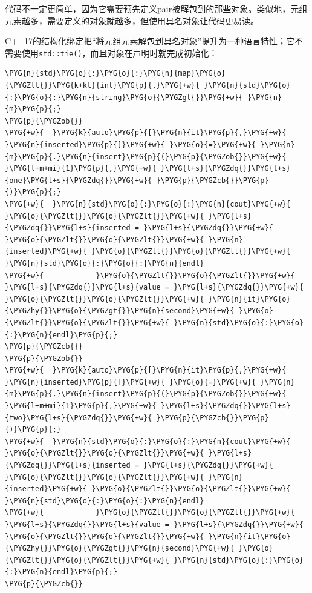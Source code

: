
代码不一定更简单，因为它需要预先定义pair被解包到的那些对象。类似地，元组元素越多，需要定义的对象就越多，但使用具名对象让代码更易读。



C++17的结构化绑定把“将元组元素解包到具名对象”提升为一种语言特性；它不需要使用\texttt{std::\allowbreak{}tie()}，而且对象在声明时就完成初始化：



\begin{codeblockbg}
\begin{Verbatim}[commandchars=\\\{\},breaklines=true,breakanywhere=true,fontsize=\codefont,xleftmargin=17bp]
\PYG{n}{std}\PYG{o}{:}\PYG{o}{:}\PYG{n}{map}\PYG{o}{\PYGZlt{}}\PYG{k+kt}{int}\PYG{p}{,}\PYG{+w}{ }\PYG{n}{std}\PYG{o}{:}\PYG{o}{:}\PYG{n}{string}\PYG{o}{\PYGZgt{}}\PYG{+w}{ }\PYG{n}{m}\PYG{p}{;}
\PYG{p}{\PYGZob{}}
\PYG{+w}{  }\PYG{k}{auto}\PYG{p}{[}\PYG{n}{it}\PYG{p}{,}\PYG{+w}{ }\PYG{n}{inserted}\PYG{p}{]}\PYG{+w}{ }\PYG{o}{=}\PYG{+w}{ }\PYG{n}{m}\PYG{p}{.}\PYG{n}{insert}\PYG{p}{(}\PYG{p}{\PYGZob{}}\PYG{+w}{ }\PYG{l+m+mi}{1}\PYG{p}{,}\PYG{+w}{ }\PYG{l+s}{\PYGZdq{}}\PYG{l+s}{one}\PYG{l+s}{\PYGZdq{}}\PYG{+w}{ }\PYG{p}{\PYGZcb{}}\PYG{p}{)}\PYG{p}{;}
\PYG{+w}{  }\PYG{n}{std}\PYG{o}{:}\PYG{o}{:}\PYG{n}{cout}\PYG{+w}{ }\PYG{o}{\PYGZlt{}}\PYG{o}{\PYGZlt{}}\PYG{+w}{ }\PYG{l+s}{\PYGZdq{}}\PYG{l+s}{inserted = }\PYG{l+s}{\PYGZdq{}}\PYG{+w}{ }\PYG{o}{\PYGZlt{}}\PYG{o}{\PYGZlt{}}\PYG{+w}{ }\PYG{n}{inserted}\PYG{+w}{ }\PYG{o}{\PYGZlt{}}\PYG{o}{\PYGZlt{}}\PYG{+w}{ }\PYG{n}{std}\PYG{o}{:}\PYG{o}{:}\PYG{n}{endl}
\PYG{+w}{            }\PYG{o}{\PYGZlt{}}\PYG{o}{\PYGZlt{}}\PYG{+w}{ }\PYG{l+s}{\PYGZdq{}}\PYG{l+s}{value = }\PYG{l+s}{\PYGZdq{}}\PYG{+w}{ }\PYG{o}{\PYGZlt{}}\PYG{o}{\PYGZlt{}}\PYG{+w}{ }\PYG{n}{it}\PYG{o}{\PYGZhy{}}\PYG{o}{\PYGZgt{}}\PYG{n}{second}\PYG{+w}{ }\PYG{o}{\PYGZlt{}}\PYG{o}{\PYGZlt{}}\PYG{+w}{ }\PYG{n}{std}\PYG{o}{:}\PYG{o}{:}\PYG{n}{endl}\PYG{p}{;}
\PYG{p}{\PYGZcb{}}
\PYG{p}{\PYGZob{}}
\PYG{+w}{  }\PYG{k}{auto}\PYG{p}{[}\PYG{n}{it}\PYG{p}{,}\PYG{+w}{ }\PYG{n}{inserted}\PYG{p}{]}\PYG{+w}{ }\PYG{o}{=}\PYG{+w}{ }\PYG{n}{m}\PYG{p}{.}\PYG{n}{insert}\PYG{p}{(}\PYG{p}{\PYGZob{}}\PYG{+w}{ }\PYG{l+m+mi}{1}\PYG{p}{,}\PYG{+w}{ }\PYG{l+s}{\PYGZdq{}}\PYG{l+s}{two}\PYG{l+s}{\PYGZdq{}}\PYG{+w}{ }\PYG{p}{\PYGZcb{}}\PYG{p}{)}\PYG{p}{;}
\PYG{+w}{  }\PYG{n}{std}\PYG{o}{:}\PYG{o}{:}\PYG{n}{cout}\PYG{+w}{ }\PYG{o}{\PYGZlt{}}\PYG{o}{\PYGZlt{}}\PYG{+w}{ }\PYG{l+s}{\PYGZdq{}}\PYG{l+s}{inserted = }\PYG{l+s}{\PYGZdq{}}\PYG{+w}{ }\PYG{o}{\PYGZlt{}}\PYG{o}{\PYGZlt{}}\PYG{+w}{ }\PYG{n}{inserted}\PYG{+w}{ }\PYG{o}{\PYGZlt{}}\PYG{o}{\PYGZlt{}}\PYG{+w}{ }\PYG{n}{std}\PYG{o}{:}\PYG{o}{:}\PYG{n}{endl}
\PYG{+w}{            }\PYG{o}{\PYGZlt{}}\PYG{o}{\PYGZlt{}}\PYG{+w}{ }\PYG{l+s}{\PYGZdq{}}\PYG{l+s}{value = }\PYG{l+s}{\PYGZdq{}}\PYG{+w}{ }\PYG{o}{\PYGZlt{}}\PYG{o}{\PYGZlt{}}\PYG{+w}{ }\PYG{n}{it}\PYG{o}{\PYGZhy{}}\PYG{o}{\PYGZgt{}}\PYG{n}{second}\PYG{+w}{ }\PYG{o}{\PYGZlt{}}\PYG{o}{\PYGZlt{}}\PYG{+w}{ }\PYG{n}{std}\PYG{o}{:}\PYG{o}{:}\PYG{n}{endl}\PYG{p}{;}
\PYG{p}{\PYGZcb{}}
\end{Verbatim}
\end{codeblockbg}

